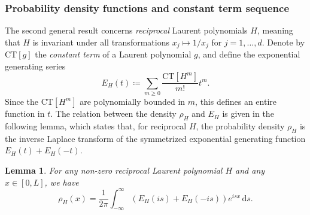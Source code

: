 \documentclass[12pt,reqno]{amsart}
\theoremstyle{definition}
\theoremstyle{plain}
\newtheorem{lemma}[theorem]{Lemma}
\theoremstyle{definition}
\renewcommand{\geq}{\geqslant}
\renewcommand{\d}{\mathrm{d}}
\begin{document}
\subsubsection*{Probability density functions and constant term sequence} The second general result concerns \emph{reciprocal} Laurent polynomials $H$, meaning that $H$ is invariant under all transformations $x_j \mapsto 1/x_j$ for $j=1,\dots,d$. 
Denote by $\text{CT}[g]$ the \emph{constant term} of a Laurent polynomial $g$, and define the exponential generating series
\begin{equation} \label{defeh}
E_H(t) \coloneqq  \sum_{m \geq 0} \frac{\text{CT}[H^m]}{m!} t^m.
\end{equation} 
Since the $\text{CT}[H^m]$ are polynomially bounded in $m$, this defines an entire function in $t$. 
The relation between the density $\rho_H$ and $E_H$ is given in the following lemma, which states that, for reciprocal $H$, the probability density $\rho_H$ is the inverse Laplace transform of the symmetrized exponential generating function $E_H(t) + E_H(-t)$.
\begin{lemma}
  \label{LemmaLaplace}
  For any non-zero reciprocal Laurent polynomial $H$ 
  and any $x \in [0,L]$, we have 
  \begin{equation} \label{EHEHinv} \rho_H(x) = \frac{1}{2 \pi} \int_{-\infty}^{\infty} (E_H(is) + E_H(-is)) e^{isx} \, \d s. \end{equation} 
  
\end{lemma}
\end{document}

